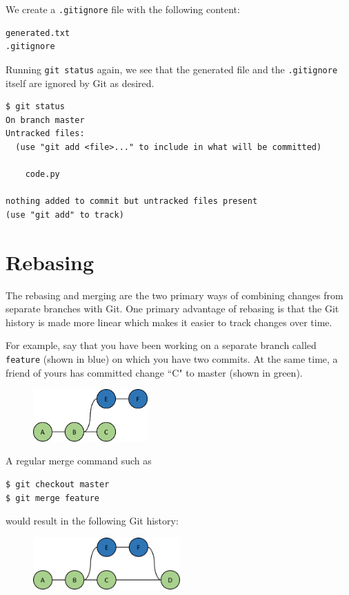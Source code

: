 \documentclass[12pt]{report}
\renewcommand\section[1]{{\chapter{#1}}}
\begin{document}
We create a \texttt{.gitignore} file with the following content:

\begin{verbatim}
generated.txt
.gitignore
\end{verbatim}

Running \texttt{git status} again, we see that the generated file and the \texttt{.gitignore} itself are ignored by Git as desired.

\begin{verbatim}
$ git status
On branch master
Untracked files:
  (use "git add <file>..." to include in what will be committed)
  
    code.py

nothing added to commit but untracked files present
(use "git add" to track)
\end{verbatim}

\section{Rebasing}

The rebasing and merging are the two primary ways of combining changes from separate branches with Git.  One primary advantage of rebasing is that the Git history is made more linear which makes it easier to track changes over time.

For example, say that you have been working on a separate branch called \texttt{feature} (shown in blue) on which you have two commits.  At the same time, a friend of yours has committed change ``C" to master (shown in green).

\begin{figure}[h]
\center
\includegraphics[height=2cm]{feature}
\end{figure}

A regular merge command such as
\begin{verbatim}
$ git checkout master
$ git merge feature
\end{verbatim}
would result in the following Git history:
\begin{figure}[h]
\center
\includegraphics[height=2cm]{merge}
\end{figure}
\end{document}
